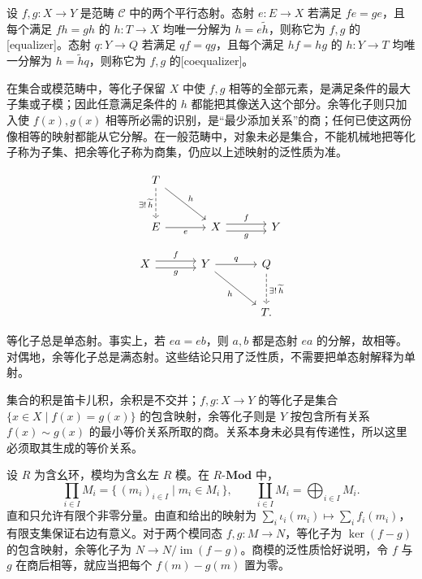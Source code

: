 \begin{definition}[等化子与余等化子]\label{b4:def:equalizer-coequalizer}
	设 \(f,g:X\rightarrow Y\) 是范畴 \(\mathcal C\) 中的两个平行态射。态射 \(e:E\rightarrow X\) 若满足 \(fe=ge\)，且每个满足 \(fh=gh\) 的 \(h:T\rightarrow X\) 均唯一分解为 \(h=e\widetilde h\)，则称它为 \(f,g\) 的[equalizer]。态射 \(q:Y\rightarrow Q\) 若满足 \(qf=qg\)，且每个满足 \(hf=hg\) 的 \(h:Y\rightarrow T\) 均唯一分解为 \(h=\widetilde hq\)，则称它为 \(f,g\) 的[coequalizer]。
\end{definition}

在集合或模范畴中，等化子保留 \(X\) 中使 \(f,g\) 相等的全部元素，是满足条件的最大子集或子模；因此任意满足条件的 \(h\) 都能把其像送入这个部分。余等化子则只加入使 \(f(x),g(x)\) 相等所必需的识别，是“最少添加关系”的商；任何已使这两份像相等的映射都能从它分解。在一般范畴中，对象未必是集合，不能机械地把等化子称为子集、把余等化子称为商集，仍应以上述映射的泛性质为准。

\[
	\begin{tikzcd}[column sep=large,row sep=large]
		T\arrow[d,dashed,"\exists!\,\widetilde h"']\arrow[dr,"h"]&&\\
		E\arrow[r,"e"']&X\arrow[r,shift left=0.7ex,"f"] \arrow[r,shift right=0.7ex,"g"']&Y
	\end{tikzcd}
\]
\[
	\begin{tikzcd}[column sep=large,row sep=large]
		X\arrow[r,shift left=0.7ex,"f"]\arrow[r,shift right=0.7ex,"g"']& Y\arrow[r,"q"]\arrow[dr,"h"']&Q\arrow[d,dashed,"\exists!\,\widetilde h"]\\
		&&T.
	\end{tikzcd}
\]

等化子总是单态射。事实上，若 \(ea=eb\)，则 \(a,b\) 都是态射 \(ea\) 的分解，故相等。对偶地，余等化子总是满态射。这些结论只用了泛性质，不需要把单态射解释为单射。

\begin{example}[集合与模中的四种构造]\label{b4:exm:elementary-limits}
	集合的积是笛卡儿积，余积是不交并；\(f,g:X\rightarrow Y\) 的等化子是集合 \(\{x\in X\mid f(x)=g(x)\}\) 的包含映射，余等化子则是 \(Y\) 按包含所有关系 \(f(x)\sim g(x)\) 的最小等价关系所取的商。关系本身未必具有传递性，所以这里必须取其生成的等价关系。

	\ProseParagraphBreak
	设 \(R\) 为含幺环，模均为含幺左 \(R\) 模。在 \(R\text{-}\mathbf{Mod}\) 中，
	\[
		\prod_{i\in I}M_i=\{\,(m_i)_{i\in I}\mid m_i\in M_i\,\},\qquad \coprod_{i\in I}M_i=\bigoplus_{i\in I}M_i.
	\]
	直和只允许有限个非零分量。由直和给出的映射为 \(\sum_i\iota_i(m_i)\mapsto\sum_i f_i(m_i)\)，有限支集保证右边有意义。对于两个模同态 \(f,g:M\rightarrow N\)，等化子为 \(\ker(f-g)\) 的包含映射，余等化子为 \(N\rightarrow N/\operatorname{im}(f-g)\)。商模的泛性质恰好说明，令 \(f\) 与 \(g\) 在商后相等，就应当把每个 \(f(m)-g(m)\) 置为零。
\end{example}

